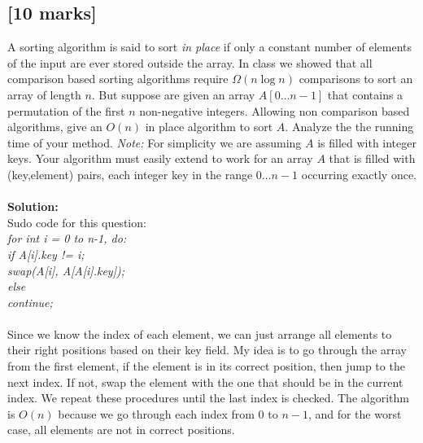 \documentclass[12pt]{article}
\begin{document}
\subsection{[10 marks]}
A sorting algorithm is said to sort \emph{in place} if only a constant
number of elements of the input are ever stored outside the array.
In class we showed that all comparison based sorting algorithms
require $\Omega(n \log n)$ comparisons to sort an array of length
$n$.  But suppose are given an array $A[0\ldots n-1]$ that contains a
permutation of the first $n$ non-negative integers.
Allowing non comparison
based algorithms, give an $O(n)$ in place algorithm to sort $A$.  Analyze the
the running time of your method.
{\em Note:} For simplicity we are assuming $A$ is filled with
integer keys.  Your algorithm must easily extend to work for an array
$A$ that is filled with (key,element) pairs, each integer key in the
range $0\ldots n-1$ occurring exactly once.
\\
\\\textbf{Solution:}
\\Sudo code for this question:
\\\textit{for int i = 0 to n-1, do:
\\if A[i].key != i;
\\swap(A[i], A[A[i].key]);
\\else
\\continue;}
\\
\\Since we know the index of each element, we can just arrange all elements to their right positions based on their key field. My idea is to go through the array from the first element, if the element is in its correct position, then jump to the next index. If not, swap the element with the one that should be in the current index. We repeat these procedures until the last index is checked. The algorithm is $O(n)$ because we go through each index from 0 to $n-1$, and for the worst case, all elements are not in correct positions. 
\end{document}
